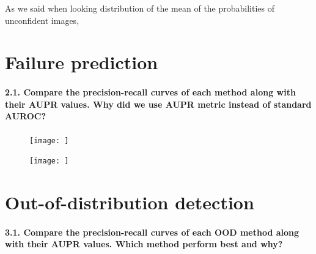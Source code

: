 As we said when looking distribution of the mean of the probabilities of unconfident images, 

\section{Failure prediction}

\paragraph*{2.1. Compare the precision-recall curves of each method along with their AUPR values. Why did we use AUPR metric instead of standard AUROC?}

\begin{figure}[H]
    \centering
    \texttt{[image: ]}
    \caption{}
    \label{fig:varratio_certain}
\end{figure}
\begin{figure}[H]
    \centering
    \texttt{[image: ]}
    \caption{}
    \label{fig:varratio_uncertain}
\end{figure}


\section{Out-of-distribution detection}

\paragraph*{3.1. Compare the precision-recall curves of each OOD method along with their AUPR values. Which method perform best and why?}